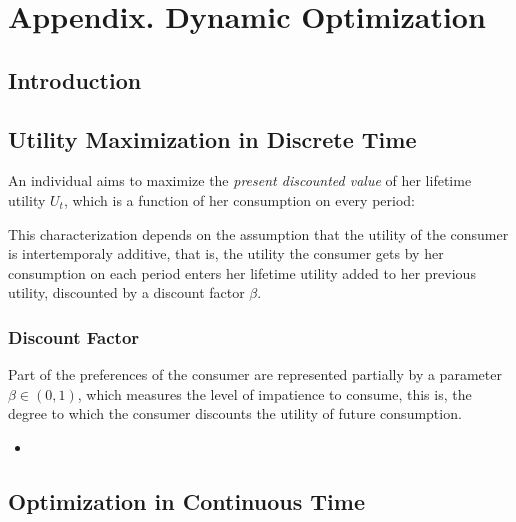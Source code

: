 \chapter*{Appendix. Dynamic Optimization}

\section{Introduction}



\section{Utility Maximization in Discrete Time}

An individual aims to maximize the \textit{present discounted value} of her lifetime utility $U_t$, which is a function of her consumption on every period:

This characterization depends on the assumption that the utility of the consumer is intertemporaly additive, that is, the utility the consumer gets by her consumption on each period enters her lifetime utility added to her previous utility, discounted by a discount factor $\beta$.\\

\subsection{Discount Factor}

Part of the preferences of the consumer are represented partially by a parameter $\beta \in (0,1)$, which measures the level of impatience to consume, this is, the degree to which the consumer discounts the utility of future consumption. 
\begin{itemize}
\item 
\end{itemize}

\section{Optimization in Continuous Time}

